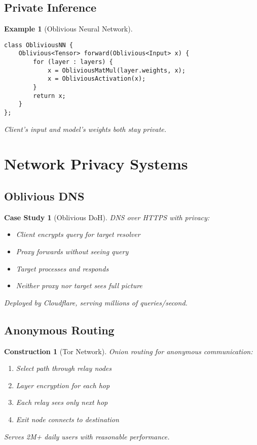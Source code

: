 \documentclass[11pt,final,hidelinks]{article}
\newtheorem{example}[theorem]{Example}
\newtheorem{construction}[theorem]{Construction}
\newtheorem{casestudy}[theorem]{Case Study}
\begin{document}
{\subsection{Private Inference}

\begin{example}[Oblivious Neural Network]
\begin{verbatim}
class ObliviousNN {
    Oblivious<Tensor> forward(Oblivious<Input> x) {
        for (layer : layers) {
            x = ObliviousMatMul(layer.weights, x);
            x = ObliviousActivation(x);
        }
        return x;
    }
};
\end{verbatim}
Client's input and model's weights both stay private.
\end{example}

\section{Network Privacy Systems}

\subsection{Oblivious DNS}

\begin{casestudy}[Oblivious DoH]
DNS over HTTPS with privacy:
\begin{itemize}
    \item Client encrypts query for target resolver
    \item Proxy forwards without seeing query
    \item Target processes and responds
    \item Neither proxy nor target sees full picture
\end{itemize}
Deployed by Cloudflare, serving millions of queries/second.
\end{casestudy}

\subsection{Anonymous Routing}

\begin{construction}[Tor Network]
Onion routing for anonymous communication:
\begin{enumerate}
    \item Select path through relay nodes
    \item Layer encryption for each hop
    \item Each relay sees only next hop
    \item Exit node connects to destination
\end{enumerate}
Serves 2M+ daily users with reasonable performance.
\end{construction}

}
\end{document}
